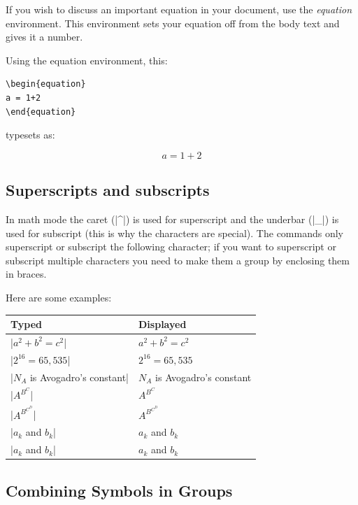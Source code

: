 If you wish to discuss an important equation in your document, use the
\emph{equation} environment.  This environment sets your equation off from the
body text and gives it a number.

Using the equation environment, this:

\begin{Verbatim}
\begin{equation}
a = 1+2
\end{equation}
\end{Verbatim}

typesets as:

\begin{equation}
a = 1+2
\end{equation}



\subsection{Superscripts and subscripts}

In math mode the caret (|^|) is used for superscript and the underbar (|_|) is
used for subscript (this is why the characters are special). The commands only
superscript or subscript the following character; if you want to superscript or
subscript multiple characters you need to make them a group by enclosing them
in braces.

Here are some examples:

\begin{center}
\begin{tabular}{l|l}
Typed                   & Displayed\\\hline
|$a^2+b^2=c^2$|         & $a^2+b^2=c^2$\\
|$2^{16}=65,535$|       & $2^{16}=65,535$\\
|$N_A$ is Avogadro's constant| & $N_A$ is Avogadro's constant \\
|$A^{B^C}$|             & $A^{B^C}$\\
|$A^{B^{C^D}}$|             & $A^{B^{C^D}}$\\
|$a_k$ and $b_k$|       & $a_k$ and $b_k$         \\
|$a_k$ and $b_k$|               & $a_k$ and $b_k$ \\
\end{tabular}
\end{center}

\subsection{Combining Symbols in Groups}

